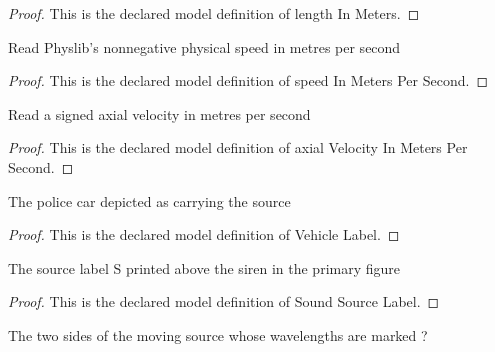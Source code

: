 \begin{proof}
  This is the declared model definition of length In Meters.
\end{proof}
\begin{definition}
  \label{def:physics:phyx-mini-0193:phyxminiproblems-problemphyxmini0193-speedinmeterspersecond}
  Read Physlib's nonnegative physical speed in metres per second
\end{definition}
\begin{proof}
  This is the declared model definition of speed In Meters Per Second.
\end{proof}
\begin{definition}
  \label{def:physics:phyx-mini-0193:phyxminiproblems-problemphyxmini0193-axialvelocityinmeterspersecond}
  Read a signed axial velocity in metres per second
\end{definition}
\begin{proof}
  This is the declared model definition of axial Velocity In Meters Per Second.
\end{proof}
\begin{definition}
  \label{def:physics:phyx-mini-0193:phyxminiproblems-problemphyxmini0193-vehiclelabel}
  The police car depicted as carrying the source
\end{definition}
\begin{proof}
  This is the declared model definition of Vehicle Label.
\end{proof}
\begin{definition}
  \label{def:physics:phyx-mini-0193:phyxminiproblems-problemphyxmini0193-soundsourcelabel}
  The source label S printed above the siren in the primary figure
\end{definition}
\begin{proof}
  This is the declared model definition of Sound Source Label.
\end{proof}
\begin{definition}
  \label{def:physics:phyx-mini-0193:phyxminiproblems-problemphyxmini0193-waveregion}
  The two sides of the moving source whose wavelengths are marked ?
\end{definition}
